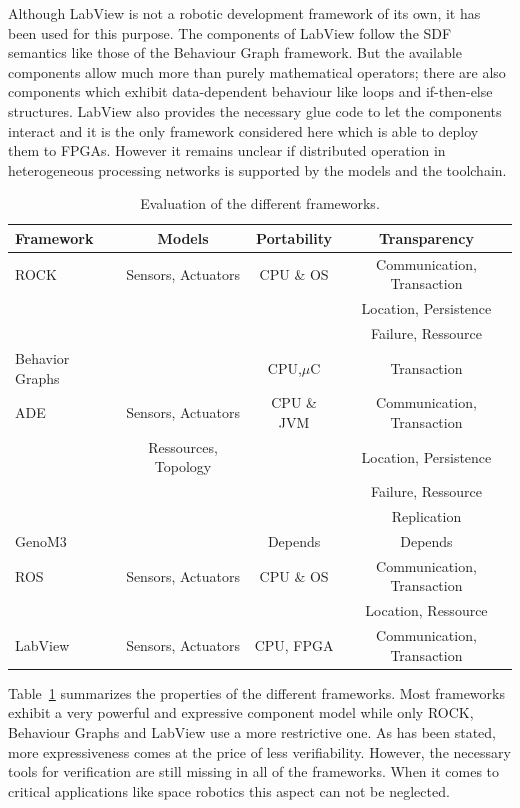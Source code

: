 \documentclass[a4paper,twocolumn]{esapub2005} %
\begin{document}
Although LabView is not a robotic development framework of its own, it has been used for this purpose.
The components of LabView follow the SDF semantics like those of the Behaviour Graph framework.
But the available components allow much more than purely mathematical operators; there are also components which exhibit data-dependent behaviour like loops and if-then-else structures.
LabView also provides the necessary glue code to let the components interact and it is the only framework considered here which is able to deploy them to FPGAs.
However it remains unclear if distributed operation in heterogeneous processing networks is supported by the models and the toolchain.

\begin{table}
	\centering
	\begin{tabular}{l|ccc}
	\hline
	Framework        & Models & Portability & Transparency\\
	\hline
	ROCK             & Sensors, Actuators & CPU \& OS & Communication, Transaction\\
	                 & & & Location, Persistence\\
	                 & & & Failure, Ressource\\                 
	Behavior Graphs  &        & CPU,$\mu$C & Transaction\\
	ADE              & Sensors, Actuators & CPU \& JVM & Communication, Transaction\\
	                 & Ressources, Topology & & Location, Persistence\\
	                 & & & Failure, Ressource\\
	                 & & & Replication\\
	GenoM3           &        & Depends & Depends\\
	ROS              & Sensors, Actuators & CPU \& OS  & Communication, Transaction\\
	                 & & & Location, Ressource\\
	LabView          & Sensors, Actuators & CPU, FPGA  & Communication, Transaction\\
	\end{tabular}
    \caption{
        Evaluation of the different frameworks.
    }
    \label{table:summary}
\end{table}

Table~\ref{table:summary} summarizes the properties of the different frameworks.
Most frameworks exhibit a very powerful and expressive component model while only ROCK, Behaviour Graphs and LabView use a more restrictive one.
As has been stated, more expressiveness comes at the price of less verifiability.
However, the necessary tools for verification are still missing in all of the frameworks.
When it comes to critical applications like space robotics this aspect can not be neglected.
\end{document}
